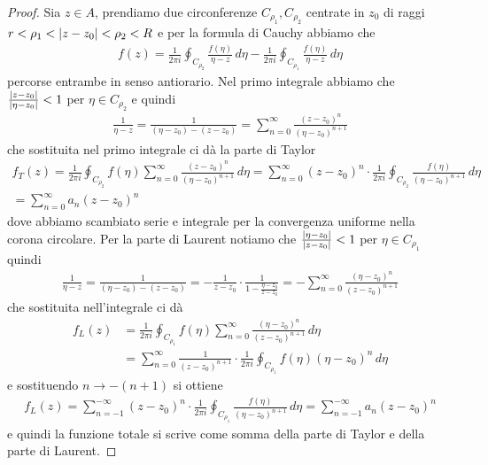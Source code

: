 \begin{proof}
  Sia $ z \in A $, prendiamo due circonferenze $ C_{\rho_1},C_{\rho_2} $ centrate in $ z_0 $ di raggi $ r < \rho_1 < \left|{z - z_0}\right| < \rho_2 < R $
  e per la formula di Cauchy abbiamo che
  \begin{align}
    f(z) = \frac1{2\pi i} \oint_{C_{\rho_2}} \frac{f(\eta)}{\eta - z} \, d\eta - \frac1{2\pi i} \oint_{C_{\rho_1}} \frac{f(\eta)}{\eta - z} \, d\eta
  \end{align}
  percorse entrambe in senso antiorario. Nel primo integrale abbiamo che $ \frac{ \left|{z - z_0}\right|}{\left|{\eta - z_0}\right|} < 1 $ per $ \eta \in C_{\rho_2} $ e quindi
  \begin{align}
    \frac1{\eta - z} = \frac1{(\eta - z_0) - (z - z_0)} = \sum_{n = 0}^\infty \frac{(z - z_0)^n}{(\eta - z_0)^{n+1}}
  \end{align}
  che sostituita nel primo integrale ci dà la parte di Taylor 
  \begin{gather}
    f_T(z) = \frac1{2\pi i} \oint_{C_{\rho_2}} f(\eta) \sum_{n = 0}^\infty \frac{(z - z_0)^n}{(\eta - z_0)^{n+1}} \,d\eta 
    = \sum_{n = 0}^\infty {(z - z_0)^n} \cdot \frac1{2\pi i} \oint_{C_{\rho_2}} \frac{f(\eta)}{(\eta - z_0)^{n+1}}\,d\eta
    \\
    = \sum_{n =0}^\infty a_n (z - z_0)^n
  \end{gather}
  dove abbiamo scambiato serie e integrale per la convergenza uniforme nella corona circolare. Per la parte di Laurent notiamo che 
  $ \frac{\left|{\eta - z_0}\right|}{\left|{z - z_0}\right|} < 1 $ per $ \eta \in C_{\rho_1} $ quindi
  \begin{align}
    \frac1{\eta - z} = \frac1{(\eta - z_0) - (z - z_0)} = -\frac1{z - z_0} \cdot \frac1{1 - \frac{\eta - z_0}{z - z_0}} 
    = - \sum_{n = 0}^\infty \frac{(\eta - z_0)^{n}}{(z - z_0)^{n+1}}
  \end{align}
  che sostituita nell'integrale ci dà
  \begin{align}
    f_L(z) &= \frac1{2\pi i} \oint_{C_{\rho_1}} f(\eta) \sum_{n = 0}^\infty \frac{(\eta - z_0)^{n}}{(z - z_0)^{n+1}} \,d\eta 
    \\
    &= \sum_{n = 0}^\infty \frac1{(z - z_0)^{n+1}} \cdot \frac1{2\pi i} \oint_{C_{\rho_1}} {f(\eta)}{(\eta - z_0)^{n}}\,d\eta
  \end{align}
  e sostituendo $ n \to -(n+1) $ si ottiene
  \begin{align}
    f_L(z) = \sum_{n = -1}^{-\infty} {(z - z_0)^{n}} \cdot \frac1{2\pi i} \oint_{C_{\rho_1}} \frac{f(\eta)}{(\eta - z_0)^{n+1}}\,d\eta 
    = \sum_{n = -1}^{-\infty} a_{n} (z - z_0)^n
  \end{align}
  e quindi la funzione totale si scrive come somma della parte di Taylor e della parte di Laurent.
\end{proof}

